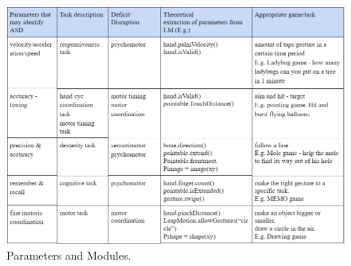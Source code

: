


\begin{figure}[!ht]  %
  
  \includegraphics[width=1\textwidth]{figures/tableOfModules.png}
  \caption[Parameters and Modules.]{Parameters and Modules.}
  \label{fig:setup}
\end{figure}

\vspace{5mm} %
\hfill \break
